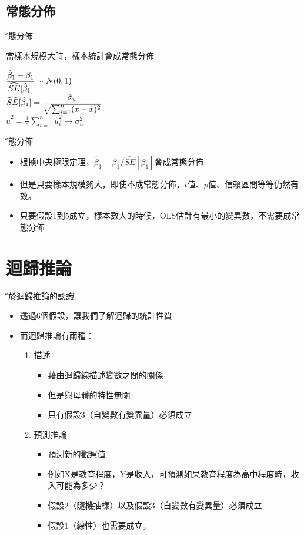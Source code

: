 \documentclass[xcolor=dvipsnames]{beamer}
\begin{document}
\subsection{常態分佈}
\begin{frame}{\H 常態分佈}
\begin{theorem}
當樣本規模大時，樣本統計會成常態分佈
\begin{center}
$\mathlarger{\frac{\hat{\beta}_{1}-\beta_{1}}{\widehat{SE}[\hat{\beta}_{1}]}}\sim N(0,1)$\\
$\widehat{SE}[\hat{\beta}_{1}]=\mathlarger{\frac{\hat{\sigma}_{u}}{\sqrt{\sum_{i=1}^n(x-\bar{x})^2}}}$\\
$\hat{u}^2=\frac{1}{n}\sum\limits_{i=1}^n\hat{u}_{i}^2\rightarrow \sigma^2_{u}$
\end{center}
\end{theorem}
\end{frame}
\begin{frame}{\H 常態分佈}
\begin{itemize}
\item 根據中央極限定理，$\hat{\beta}_{1}-\beta_{1}/\widehat{SE}[\hat{\beta}_{1}]$會成常態分佈
\item 但是只要樣本規模夠大，即使不成常態分佈，$t$值、$p$值、信賴區間等等仍然有效。
\item 只要假設1到5成立，樣本數大的時候，OLS估計有最小的變異數，不需要成常態分佈
\end{itemize}
\end{frame}
\section{迴歸推論}
\begin{frame}{\H 對於迴歸推論的認識}
\begin{itemize}
\item 透過6個假設，讓我們了解迴歸的統計性質
\item 而迴歸推論有兩種：
\begin{enumerate}
\item 描述
\begin{itemize}
\item 藉由迴歸線描述變數之間的關係
\item 但是與母體的特性無關
\item 只有假設3（自變數有變異量）必須成立
\end{itemize}
\item 預測推論
\begin{itemize}
\item 預測新的觀察值
\item 例如X是教育程度，Y是收入，可預測如果教育程度為高中程度時，收入可能為多少？
\item 假設2（隨機抽樣）以及假設3（自變數有變異量）必須成立
\item 假設1（線性）也需要成立。
\end{itemize}
\end{enumerate}
\end{itemize}
\end{frame}
\end{document}
